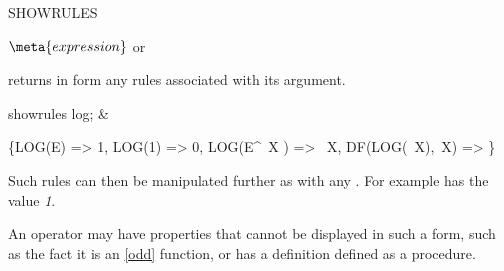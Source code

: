 \begin{Operator}{SHOWRULES}
\begin{Syntax}
\(\meta{expression}\) or
  
\end{Syntax}

 returns in  form any 
 rules associated with its argument.

\begin{Examples}
showrules log; &
\begin{multilineoutput}{6cm}
\{LOG(E) => 1,
 LOG(1) => 0,
 LOG(E^{~X} ) => ~X,
 DF(LOG(~X),~X) => \}
\end{multilineoutput}
\end{Examples}

Such rules can then be manipulated further as with any .  For
example
 has the value {\em 1}.

\begin{Comments}
An operator may have properties that cannot be displayed in such a form,
such as the fact it is an \ref{odd} function, or has a definition defined
as a procedure.
\end{Comments}
\end{Operator}



